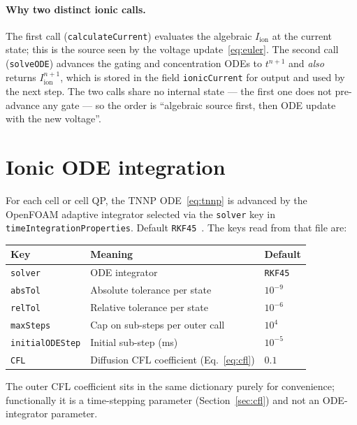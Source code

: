 \documentclass[11pt,a4paper]{article}
\newcommand{\Iion}{I_{\text{ion}}}
\newcommand{\code}[1]{\texttt{\small #1}}
\begin{document}
\paragraph{Why two distinct ionic calls.}
The first call (\code{calculateCurrent}) evaluates the algebraic
$\Iion$ at the current state; this is the source seen by the voltage
update~\eqref{eq:euler}. The second call (\code{solveODE}) advances
the gating and concentration ODEs to $t^{n+1}$ and \emph{also} returns
$\Iion^{n+1}$, which is stored in the field \code{ionicCurrent} for
output and used by the next step. The two calls share no internal
state — the first one does not pre-advance any gate — so the order is
``algebraic source first, then ODE update with the new voltage''.

\section{Ionic ODE integration}
\label{sec:ode}

For each cell or cell QP, the TNNP ODE~\eqref{eq:tnnp} is advanced
by the OpenFOAM adaptive integrator selected via the \code{solver}
key in \code{timeIntegrationProperties}. Default \code{RKF45}~\cite{hairer2}.
The keys read from that file are:

\begin{center}
\begin{tabular}{@{}lll@{}}
\toprule
Key & Meaning & Default \\
\midrule
\code{solver} & ODE integrator & \code{RKF45} \\
\code{absTol} & Absolute tolerance per state & $10^{-9}$ \\
\code{relTol} & Relative tolerance per state & $10^{-6}$ \\
\code{maxSteps} & Cap on sub-steps per outer call & $10^{4}$ \\
\code{initialODEStep} & Initial sub-step (ms) & $10^{-5}$ \\
\code{CFL} & Diffusion CFL coefficient
            (Eq.~\eqref{eq:cfl}) & $0.1$ \\
\bottomrule
\end{tabular}
\end{center}

The outer CFL coefficient sits in the same dictionary purely for
convenience; functionally it is a time-stepping parameter
(Section~\ref{sec:cfl}) and not an ODE-integrator parameter.
\end{document}
